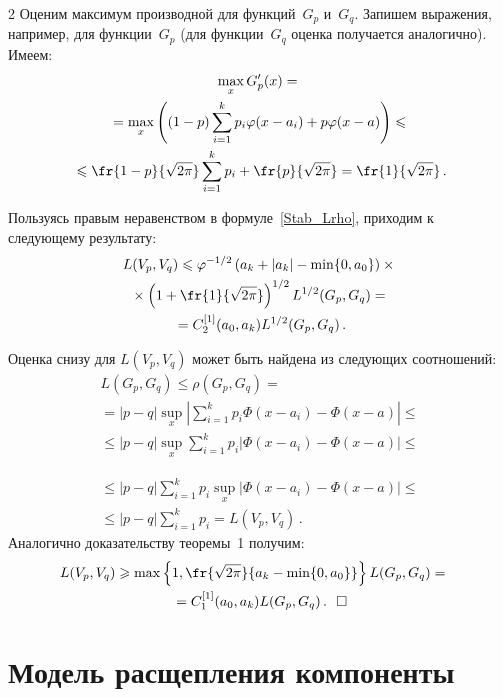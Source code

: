 \begin{multicols}{2}
Оценим максимум производной для функций~$G_p$ и~$G_q$. Запишем
выражения, например, для функции~$G_p$ (для функции~$G_q$ оценка
получается аналогично). Имеем:
\begin{multline*}
\max\limits_x G_p'(x)={}\\
{}=\max\limits_x \left((1-p)\sum\limits_{i=1}^k
p_i\varphi(x-a_i)+p\varphi(x-a)\right)\leqslant{}\\
{}\leqslant
\fr{1-p}{\sqrt{2\pi}}\sum\limits_{i=1}^k p_i+
\fr {p}{\sqrt{2\pi}}=\fr{1}{\sqrt{2\pi}}\,.
\end{multline*}

Пользуясь правым неравенством в формуле~\eqref{Stab_Lrho},
приходим к следующему результату:
\begin{multline*}
L(V_p,V_q)\leqslant\varphi^{-1/2}\left(a_k+|a_k|-\min\{0,a_0\}\right)\times{}\\
{}\times
\left(1+\fr{1}{\sqrt{2\pi}}\right)^{1/2}L^{1/2}(G_p,G_q)
={}\\
{}=C_2^{[1]}(a_0,a_k)L^{1/2}(G_p,G_q)\,.
\end{multline*}

Оценка снизу для $L(V_p,V_q)$ может быть найдена из следующих
соотношений:
\begin{multline*}
L(G_p,G_q)\leqslant\rho(G_p,G_q)={}\\
{}=|p-q|\sup\limits_x\left|\sum\limits_{i=1}^k
p_i\Phi(x-a_i)-\Phi(x-a)\right|\leqslant{}\\
{}\leqslant |p-q|\sup\limits_x\sum\limits_{i=1}^k
p_i|\Phi(x-a_i)-\Phi(x-a)|\leqslant{}
\end{multline*}

\noindent
\begin{multline*}
{}\leqslant |p-q|\sum\limits_{i=1}^k
p_i\sup\limits_x|\Phi(x-a_i)-\Phi(x-a)|
\leqslant{}\\
{}\leqslant |p-q|\sum\limits_{i=1}^k p_i= L(V_p,V_q)\,.
\end{multline*}
Аналогично доказательству теоремы~1 получим:
\begin{multline*}
\hspace*{-7.22379pt}L(V_p,V_q)\geqslant\max\left\{1,\fr{\sqrt{2\pi}}{a_k-\min\{0,a_0\}}\right\}
L(G_p,G_q)={}\\
{}=C_1^{[1]}(a_0,a_k)L(G_p,G_q)\,.~~\square
\end{multline*}


\section{Модель расщепления компоненты}


\end{multicols}
